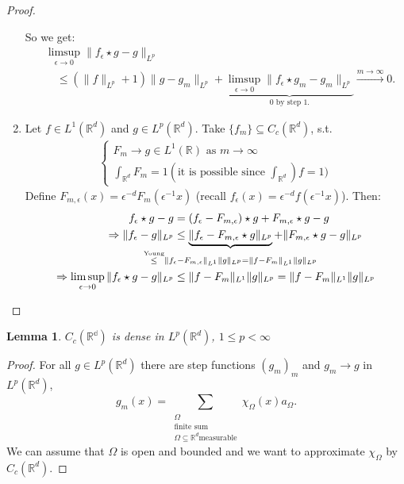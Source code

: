 \documentclass{report}
\theoremstyle{tommy}
\newtheorem{lem}[defn]{Lemma}
\begin{document}
\begin{proof}
\begin{enumerate}[label=Step \arabic*:]
      So we get:
      \begin{align*}
        &\limsup_{\epsilon \to 0} \|f_\epsilon \star g - g\|_{L^p} \\
        &\quad\le (\|f\|_{L^p} + 1) \|g - g_m\|_{L^p} + \underbrace{\limsup_{\epsilon \to 0} \|f_\epsilon \star g_m - g_m\|_{L^p}}_{0 \text{ by step 1.}} \xrightarrow{m \to \infty} 0.
      \end{align*}
      \item Let \(f \in L^1(\mathbb{R}^d)\) and \(g \in L^p(\mathbb{R}^d)\). Take \(\{f_m\} \subseteq C_c(\mathbb{R}^d)\), s.t. 
      \begin{align*}
        \begin{cases}
          F_m \to g \in L^1(\mathbb{R}) \text{ as } m \to \infty \\
          \int_{\mathbb{R}^d} F_m = 1 (\text{it is possible since } \int_{\mathbb{R}^d}) f = 1)
        \end{cases}
      \end{align*} 
      Define \(F_{m, \epsilon}(x) = \epsilon^{-d} F_m(\epsilon^{-1} x)\) (recall \(f_\epsilon(x) = \epsilon^{-d} f(\epsilon^{-1} x)\)). Then:
      \begin{align*}
        f_\epsilon \star g - g &= (f_\epsilon - F_{m, \epsilon}) \star g + F_{m, \epsilon} \star g -g \\
        \Rightarrow \|f_\epsilon - g \|_{L^p} &\le \underbrace{\|f_\epsilon - F_{m, \epsilon} \star g\|_{L^p}}_{\mathclap{\overset{\text{Young}}{\le} \|f_\epsilon - F_{m, \epsilon}\|_{L^1} \|g\|_{L^p} = \|f - F_m\|_{L^1} \|g\|_{L^p}}} + \|F_{m, \epsilon} \star g - g\|_{L^p} \\
        \Rightarrow \limsup_{\epsilon \to 0} \|f_\epsilon \star g - g\|_{L^p} &\le \|f - F_m\|_{L^1} \|g\|_{L^p} = \|f - F_m\|_{L^1} \|g \|_{L^p} \qedhere
      \end{align*}
    \end{enumerate}
  \end{proof}

  
  \begin{lem}
    \(C_c(\mathbb{{R}^d})\) is dense in \(L^p(\mathbb{R}^d)\), \(1 \le p < \infty\)
  \end{lem}

  \begin{proof}
    For all \(g \in L^p(\mathbb{R}^d)\) there are step functions \((g_m)_m\) and \(g_m \to g\) in \(L^p(\mathbb{R}^d)\),
    \[g_m(x) = \sum_{\substack{\Omega \\ \text{finite sum} \\ \Omega \subseteq \mathbb{R}^d \text{measurable}}} \chi_\Omega(x) a_\Omega.\]
    We can assume that \(\Omega\) is open and bounded and we want to approximate \(\chi_\Omega\) by \(C_c(\mathbb{R}^d)\). 
  \end{proof}
\end{document}

